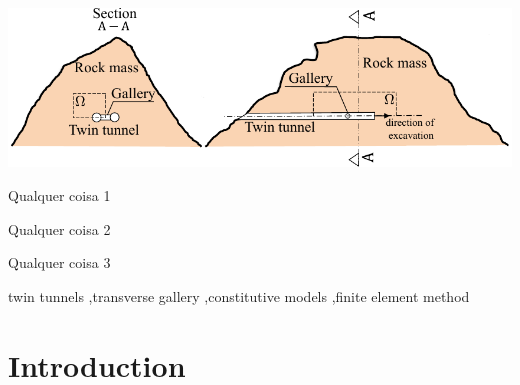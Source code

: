 \documentclass[a4paper,fleqn]{cas-sc}
\begin{document}
\begin{abstract}
\end{abstract}

\begin{graphicalabstract}
\includegraphics[scale=1]{Domain.pdf}
\end{graphicalabstract}

\begin{highlights}
	\item Qualquer coisa 1
	\item Qualquer coisa 2
	\item Qualquer coisa 3 
\end{highlights}

\begin{keywords}
twin tunnels \sep transverse gallery \sep constitutive models \sep finite element method
\end{keywords}

\maketitle

\section{Introduction}\label{}
\end{document}
